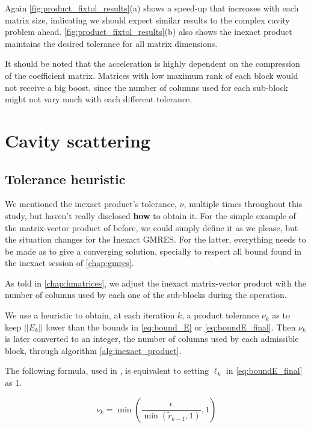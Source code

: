 Again \autoref{fig:product_fixtol_results}(a) shows a speed-up that increases with each matrix size, indicating we should expect similar results to the complex cavity problem ahead. \autoref{fig:product_fixtol_results}(b) also shows the inexact product maintains the desired tolerance for all matrix dimensions.

It should be noted that the acceleration is highly dependent on the compression of the coefficient matrix. Matrices with low maximum rank of each block would not receive a big boost, since the number of columns used for each sub-block might not vary much with each different tolerance.



\section{Cavity scattering}

\subsection{Tolerance heuristic}

We mentioned the inexact product's tolerance, $\nu$, multiple times throughout this study, but haven't really disclosed \textbf{how} to obtain it. For the simple example of the matrix-vector product of before, we could simply define it as we please, but the situation changes for the Inexact GMRES. For the latter, everything needs to be made as to give a converging solution, specially to respect all bound found in the inexact session of \autoref{chap:gmres}.

As told in \autoref{chap:hmatrices}, we adjust the inexact matrix-vector product with the number of columns used by each one of the sub-blocks during the operation.

We use a heuristic to obtain, at each iteration $k$, a product tolerance $\nu_{k}$ as to keep $||E_{k}||$ lower than the bounds in \autoref{eq:bound_E} or \autoref{eq:boundE_final}. Then $\nu_{k}$ is later converted to an integer, the number of columns used by each admissible block, through algorithm \ref{alg:inexact_product}.

The following formula, used in \cite{wang2016inexactkryloviterationsrelaxation}, is equivalent to setting $\ell_{k}$ in \autoref{eq:boundE_final} as 1.

\begin{equation}\label{eq:gen_heuristics}
    \nu_{k} = \min \left(\frac{\epsilon}{\min(\tilde{r}_{k-1},1)},1 \right)
\end{equation}

